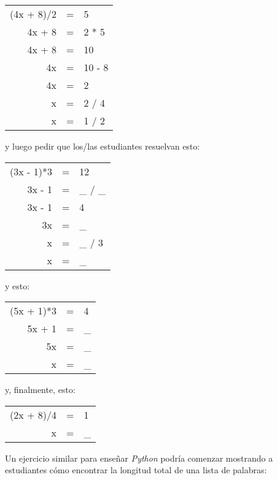 \begin{center}
\begin{tabular}{rcl}
  (4x + 8)/2    & = &    5    \\
  4x + 8    & = &    2 * 5    \\
  4x + 8    & = &    10    \\
  4x        & = &    10 - 8    \\
  4x        & = &    2    \\
  x        & = &    2 / 4    \\
  x        & = &    1 / 2
\end{tabular}
\end{center}

\noindent
y luego pedir que los/las estudiantes resuelvan esto:

\begin{center}
\begin{tabular}{rcl}
  (3x - 1)*3    & = &    12    \\
  3x - 1    & = &    \_ / \_    \\
  3x - 1    & = &    4    \\
  3x        & = &    \_    \\
  x        & = &    \_ / 3    \\
  x        & = &    \_
\end{tabular}
\end{center}

\noindent
y esto:

\begin{center}
\begin{tabular}{rcl}
  (5x + 1)*3    & = &    4    \\
  5x + 1    & = &    \_     \\
  5x        & = &    \_     \\
  x        & = &    \_
\end{tabular}
\end{center}

\noindent
y, finalmente, esto:

\begin{center}
\begin{tabular}{rcl}
  (2x + 8)/4    & = &    1    \\
   x        & = &    \_
\end{tabular}
\end{center}

Un ejercicio similar para enseñar \emph{Python} podría comenzar mostrando a estudiantes
cómo encontrar la longitud total de una lista de palabras:

